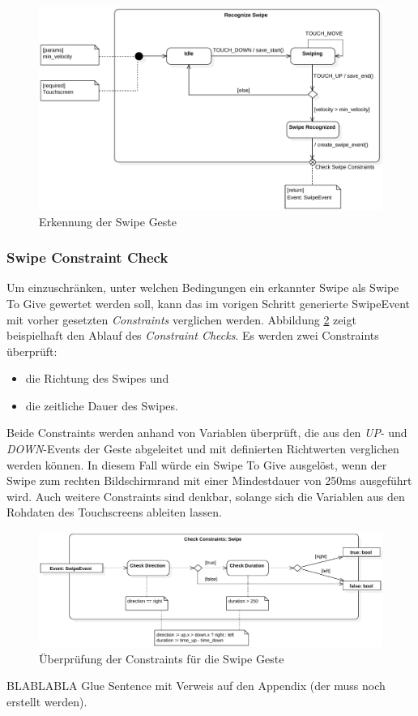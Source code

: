 {\begin{figure}[h]
\includegraphics[width=\textwidth]{swipe_recognize.pdf}
\caption{Erkennung der Swipe Geste}
\label{recognize_swipe}
\end{figure}

\subsubsection*{Swipe Constraint Check}
Um einzuschränken, unter welchen Bedingungen ein erkannter Swipe als Swipe To Give gewertet werden soll, kann das im vorigen Schritt generierte SwipeEvent mit vorher gesetzten \textit{Constraints} verglichen werden. Abbildung \ref{check_constraints} zeigt beispielhaft den Ablauf des \textit{Constraint Checks}. Es werden zwei Constraints überprüft:
\begin{itemize}
\item die Richtung des Swipes und
\item die zeitliche Dauer des Swipes.
\end{itemize}
Beide Constraints werden anhand von Variablen überprüft, die aus den \textit{UP}- und \textit{DOWN}-Events der Geste abgeleitet und mit definierten Richtwerten verglichen werden können. In diesem Fall würde ein Swipe To Give ausgelöst, wenn der Swipe zum rechten Bildschirmrand mit einer Mindestdauer von 250ms ausgeführt wird. Auch weitere Constraints sind denkbar, solange sich die Variablen aus den Rohdaten des Touchscreens ableiten lassen.
\begin{figure}[h]
\includegraphics[width=\textwidth]{swipe_check_constraints.pdf}
\caption{Überprüfung der Constraints für die Swipe Geste}
\label{check_constraints}
\end{figure}

BLABLABLA Glue Sentence mit Verweis auf den Appendix (der muss noch erstellt werden).

}



